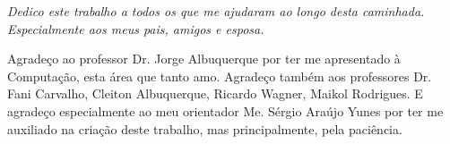 \documentclass[
	12pt,				%
	openany,			%
	oneside,			%
	a4paper,			%
	english,			%
	brazil				%
	]{{Modelo/abntex2_FBUNI}}
\begin{document}


\frenchspacing 


\imprimircapa
\imprimirfolhaderosto*

%
%
\cleardoublepage

\begin{dedicatoria}
   \vspace*{\fill}
   \centering
   \noindent
   \textit{
    Dedico este trabalho a todos os que me ajudaram ao longo desta caminhada. Especialmente aos meus pais, amigos e esposa.
   }
   \vspace*{\fill}
\end{dedicatoria}

\begin{agradecimentos}
    Agradeço ao professor Dr. Jorge Albuquerque por ter me apresentado à Computação, esta área que tanto amo. Agradeço também aos professores Dr. Fani Carvalho, Cleiton Albuquerque, Ricardo Wagner, Maikol Rodrigues. E agradeço especialmente ao meu orientador Me. Sérgio Araújo Yunes por ter me auxiliado na criação deste trabalho, mas principalmente, pela paciência.
    
\end{agradecimentos}
\end{document}
